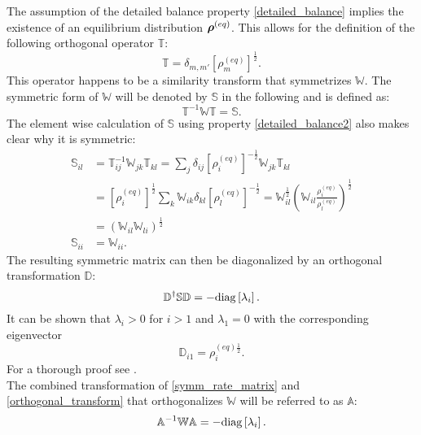 The assumption of the detailed balance property \eqref{detailed_balance} implies the existence of an equilibrium distribution $\boldsymbol{\mathbf{\rho}}^{(eq)}$. This allows for the definition of the following orthogonal operator $\mathbb{T}$:
\begin{equation}
    \mathbb{T} = \delta_{m,m'} [\rho_m^{(eq)}]^{\frac{1}{2}}.
    \label{symmetrisation_transform}
\end{equation}
This operator happens to be a similarity transform that symmetrizes $\mathbb{W}$. The symmetric form of $\mathbb{W}$ will be denoted by $\mathbb{S}$ in the following and is defined as:
\begin{equation}
    \mathbb{T}^{-1}\mathbb{W}\mathbb{T} = \mathbb{S}.
    \label{symm_rate_matrix}
\end{equation}
The element wise calculation of $\mathbb{S}$ using property \eqref{detailed_balance2} also makes clear why it is symmetric:
\begin{align}
    \mathbb{S}_{il} &= \mathbb{T}^{-1}_{ij} \mathbb{W}_{jk} \mathbb{T}_{kl} = \sum_j \delta_{ij} [\rho^{(eq)}_i]^{-\frac{1}{2}} \mathbb{W}_{jk} \mathbb{T}_{kl} \\ \nonumber
    &= [\rho^{(eq)}_{i}]^{\frac{1}{2}} \sum_{k} \mathbb{W}_{ik} \delta_{kl} [\rho^{(eq)}_l]^{-\frac{1}{2}} = \mathbb{W}_{il}^{\frac{1}{2}} \left( \mathbb{W}_{il} \frac{\rho^{(eq)}_i}{\rho^{(eq)}_l} \right)^{\frac{1}{2}} \\ \nonumber
    &= \left(\mathbb{W}_{il} \mathbb{W}_{li}\right)^{\frac{1}{2}} \\ \nonumber
    \mathbb{S}_{ii} &= \mathbb{W}_{ii}.
\end{align}
The resulting symmetric matrix can then be diagonalized by an orthogonal transformation $\mathbb{D}$:
\begin{equation}
    \mathbb{D}^{\dagger} \mathbb{S} \mathbb{D} = -{\rm diag}\left[ \lambda_i \right].
    \label{orthogonal_transform}
\end{equation}
It can be shown that $\lambda_i > 0$ for $i>1$ and $\lambda_1 = 0$ with the corresponding eigenvector
\begin{equation}
    \mathbb{D}_{i1} = \rho^{(eq)\frac{1}{2}}_{i}.
\end{equation}
For a thorough proof see \cite{Oppenheim1977}.\\
The combined transformation of \eqref{symm_rate_matrix} and \eqref{orthogonal_transform} that orthogonalizes $\mathbb{W}$ will be referred to as $\mathbb{A}$:
\begin{equation}
    \mathbb{A}^{-1}\mathbb{W}\mathbb{A} = -{\rm diag} \left[ \lambda_i \right].
    \label{diag_transform}
\end{equation}
